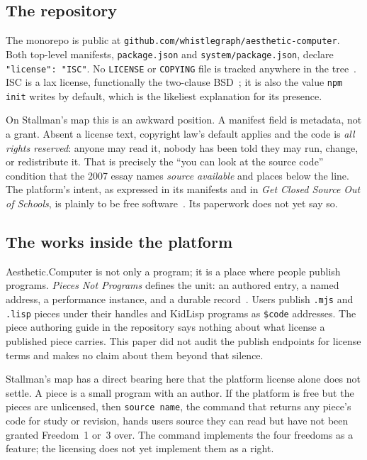 \documentclass[10pt,letterpaper,twocolumn]{article}
\newcommand{\acdot}{{\color{acpink}.}}
\newcommand{\ac}{Aesthetic{\acdot}Computer}
\newcommand{\code}[1]{\texttt{#1}}
\newcommand{\term}[1]{``#1''}
\begin{document}
\subsection{The repository}

The monorepo is public at \code{github.com/\allowbreak whistlegraph/\allowbreak aesthetic-computer}. Both top-level manifests, \code{package.json} and \code{system/package.json}, declare \code{"license": "ISC"}. No \code{LICENSE} or \code{COPYING} file is tracked anywhere in the tree~\citep{acrepo2026}. ISC is a lax license, functionally the two-clause BSD~\citep{isc_license}; it is also the value \code{npm init} writes by default, which is the likeliest explanation for its presence.

On Stallman's map this is an awkward position. A manifest field is metadata, not a grant. Absent a license text, copyright law's default applies and the code is \emph{all rights reserved}: anyone may read it, nobody has been told they may run, change, or redistribute it. That is precisely the \term{you can look at the source code} condition that the 2007 essay names \emph{source available} and places below the line. The platform's intent, as expressed in its manifests and in \emph{Get Closed Source Out of Schools}, is plainly to be free software~\citep{scudder2026openschools}. Its paperwork does not yet say so.

\subsection{The works inside the platform}

\ac{} is not only a program; it is a place where people publish programs. \emph{Pieces Not Programs} defines the unit: an authored entry, a named address, a performance instance, and a durable record~\citep{scudder2026pieces}. Users publish \code{.mjs} and \code{.lisp} pieces under their handles and KidLisp programs as \code{\$code} addresses. The piece authoring guide in the repository says nothing about what license a published piece carries. This paper did not audit the publish endpoints for license terms and makes no claim about them beyond that silence.

Stallman's map has a direct bearing here that the platform license alone does not settle. A piece is a small program with an author. If the platform is free but the pieces are unlicensed, then \code{source name}, the command that returns any piece's code for study or revision, hands users source they can read but have not been granted Freedom~1 or~3 over. The command implements the four freedoms as a feature; the licensing does not yet implement them as a right.
\end{document}
